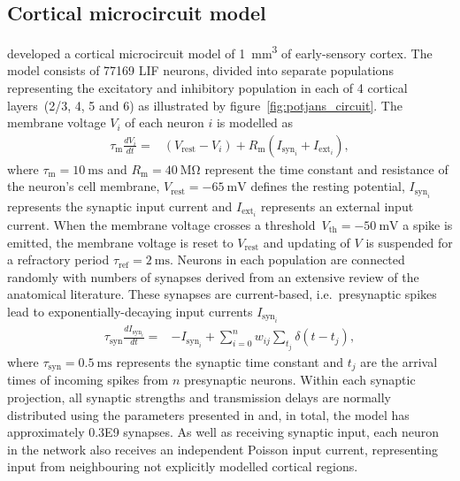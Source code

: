 \documentclass[utf8]{frontiersSCNS} %
\begin{document}
\subsection{Cortical microcircuit model}
\label{sec:methods/cortical_microcircuit}
\citet{Potjans2012} developed a cortical microcircuit model of \SI{1}{\milli\metre\cubed} of early-sensory cortex.
The model consists of \num{77169} LIF neurons, divided into separate populations representing the excitatory and inhibitory population in each of 4 cortical layers~(2/3, 4, 5 and 6) as illustrated by figure~\ref{fig:potjans_circuit}.
The membrane voltage $V_{i}$ of each neuron $i$ is modelled as
%
\begin{align}
    \tau_{\text{m}} \frac{dV_{i}}{dt} = & (V_{\text{rest}} - V_{i}) + R_{\text{m}}(I_{\text{syn}_{i}} + I_{\text{ext}_{i}}), \label{eq:lif_neuron}
\end{align}
%
where $\tau_{\text{m}} = \SI{10}{\milli\second}$ and $R_{\text{m}} = \SI{40}{\mega\ohm}$ represent the time constant and resistance of the neuron's cell membrane, $V_{\text{rest}} = \SI{-65}{\milli\volt}$ defines the resting potential, $I_{\text{syn}_{i}}$ represents the synaptic input current and $I_{\text{ext}_i}$ represents an external input current.
When the membrane voltage crosses a threshold~$V_{\text{th}} = \SI{-50}{\milli\volt}$ a spike is emitted, the membrane voltage is reset to $V_{\text{rest}}$ and updating of $V$ is suspended for a refractory period $\tau_{\text{ref}} = \SI{2}{\milli\second}$.
Neurons in each population are connected randomly with numbers of synapses derived from an extensive review of the anatomical literature.
These synapses are current-based, i.e.~presynaptic spikes lead to exponentially-decaying input currents $I_{\text{syn}_{i}}$
%
\begin{align}
    \tau_{\text{syn}} \frac{dI_{\text{syn}_{i}}}{dt} = & -I_{\text{syn}_{i}} + \sum_{i=0}^{n} w_{ij} \sum_{t_{j}}  \delta(t - t_{j}),\label{eq:exp_neuron_input_current}
\end{align}
%
where $\tau_{\text{syn}} = \SI{0.5}{\milli\second}$ represents the synaptic time constant and $t_{j}$ are the arrival times of incoming spikes from $n$ presynaptic neurons.
Within each synaptic projection, all synaptic strengths and transmission delays are normally distributed using the parameters presented in \citet[table 5]{Potjans2012} and, in total, the model has approximately \num{0.3E9} synapses.
As well as receiving synaptic input, each neuron in the network also receives an independent Poisson input current, representing input from neighbouring not explicitly modelled cortical regions.
\end{document}
